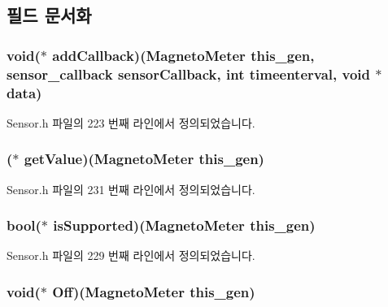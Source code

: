 \subsection{필드 문서화}
\hypertarget{struct___magneto_meter_a9181e28db7a7c1bc776db231010abe84}{
\subsubsection[{add\-Callback}]{\setlength{\rightskip}{0pt plus 5cm}void($\ast$  add\-Callback)({\bf Magneto\-Meter} this\-\_\-gen, {\bf sensor\-\_\-callback} sensor\-Callback, int timeenterval, void $\ast$data)}}\label{struct___magneto_meter_a9181e28db7a7c1bc776db231010abe84}


Sensor.\-h 파일의 223 번째 라인에서 정의되었습니다.

\hypertarget{struct___magneto_meter_a481059371d9d2a273df0fabe18e388a0}{
\subsubsection[{get\-Value}]{($\ast$  get\-Value)({\bf Magneto\-Meter} this\-\_\-gen)}}\label{struct___magneto_meter_a481059371d9d2a273df0fabe18e388a0}


Sensor.\-h 파일의 231 번째 라인에서 정의되었습니다.

\hypertarget{struct___magneto_meter_aac07cae3561bfd9df065be55fb79f145}{
\subsubsection[{is\-Supported}]{\setlength{\rightskip}{0pt plus 5cm}bool($\ast$  is\-Supported)({\bf Magneto\-Meter} this\-\_\-gen)}}\label{struct___magneto_meter_aac07cae3561bfd9df065be55fb79f145}


Sensor.\-h 파일의 229 번째 라인에서 정의되었습니다.

\hypertarget{struct___magneto_meter_ae74e6adbf008d638c954bf852fef4657}{
\subsubsection[{Off}]{\setlength{\rightskip}{0pt plus 5cm}void($\ast$  Off)({\bf Magneto\-Meter} this\-\_\-gen)}}\label{struct___magneto_meter_ae74e6adbf008d638c954bf852fef4657}


